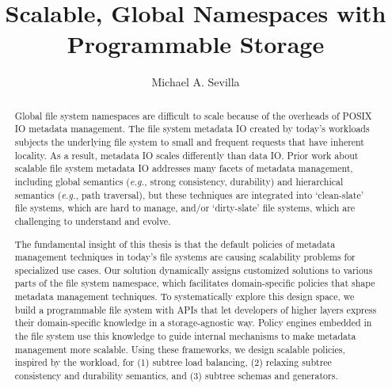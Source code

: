 \title{Scalable, Global Namespaces with Programmable Storage}
\author{Michael A. Sevilla}
\deanlinethree{}

\begin{frontmatter}
	\maketitle\copyrightpage\tableofcontents\listoffigures\listoftables
	\begin{abstract}

Global file system namespaces are difficult to scale because of the overheads
of POSIX IO metadata management. The file system metadata IO created by today's
workloads subjects the underlying file system to small and frequent requests
that have inherent locality. As a result, metadata IO scales differently than
data IO.  Prior work about scalable file system metadata IO addresses many
facets of metadata management, including global semantics ({\it e.g.}, strong
consistency, durability) and hierarchical semantics ({\it e.g.}, path
traversal), but these techniques are integrated into `clean-slate' file
systems, which are hard to manage, and/or `dirty-slate' file systems, which
are challenging to understand and evolve.

The fundamental insight of this thesis is that the default policies of metadata
management techniques in today's file systems are causing scalability problems
for specialized use cases. Our solution dynamically assigns customized
solutions to various parts of the file system namespace, which facilitates
domain-specific policies that shape metadata management techniques.  To
systematically explore this design space, we build a programmable file system
with APIs that let developers of higher layers express their domain-specific
knowledge in a storage-agnostic way.  Policy engines embedded in the file
system use this knowledge to guide internal mechanisms to make metadata
management more scalable.  Using these frameworks, we design scalable policies,
inspired by the workload, for (1) subtree load balancing, (2) relaxing subtree
consistency and durability semantics, and (3) subtree schemas and generators.  


\end{abstract}
\end{frontmatter}
